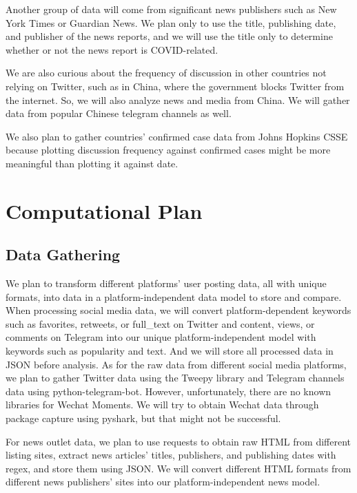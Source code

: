 \documentclass[fontsize=11pt]{article}
\begin{document}
    Another group of data will come from significant news publishers such as New York Times or Guardian News. We plan only to use the title, publishing date, and publisher of the news reports, and we will use the title only to determine whether or not the news report is COVID-related.

    We are also curious about the frequency of discussion in other countries not relying on Twitter, such as in China, where the government blocks Twitter from the internet. So, we will also analyze news and media from China. We will gather data from popular Chinese telegram channels as well.

    We also plan to gather countries’ confirmed case data from Johns Hopkins CSSE because plotting discussion frequency against confirmed cases might be more meaningful than plotting it against date.

    \section*{Computational Plan}

    \subsection*{Data Gathering}

    \indent

    We plan to transform different platforms’ user posting data, all with unique formats, into data in a platform-independent data model to store and compare. When processing social media data, we will convert platform-dependent keywords such as favorites, retweets, or full\_text on Twitter and content, views, or comments on Telegram into our unique platform-independent model with keywords such as popularity and text. And we will store all processed data in JSON before analysis. As for the raw data from different social media platforms, we plan to gather Twitter data using the Tweepy library and Telegram channels data using python-telegram-bot. However, unfortunately, there are no known libraries for Wechat Moments. We will try to obtain Wechat data through package capture using pyshark, but that might not be successful.

    For news outlet data, we plan to use requests to obtain raw HTML from different listing sites, extract news articles’ titles, publishers, and publishing dates with regex, and store them using JSON. We will convert different HTML formats from different news publishers’ sites into our platform-independent news model.
\end{document}
